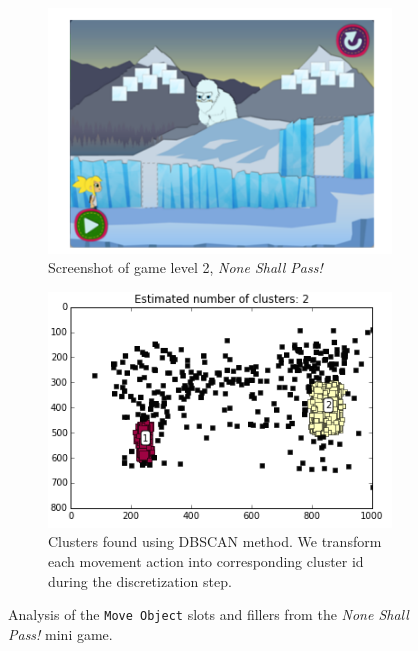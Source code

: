 \documentclass{sigchi}
\begin{document}
	\begin{figure}[ht]
		\centering
		\begin{subfigure}[t]{.5\textwidth}
			\centering
			\includegraphics[width=0.9\columnwidth]{figures/glacier_screenshot.png}
			\caption{Screenshot of game level 2, \textit {None Shall Pass!} \label{fig:screenshot}}
		\end{subfigure}
		\begin{subfigure}[t]{.5\textwidth}
			\centering
			\includegraphics[width=0.9\columnwidth]{figures/glacier_positions.png}
			\caption{Clusters found using DBSCAN method. We transform each movement action into corresponding cluster id during the discretization step. \label{fig:clustering}}
		\end{subfigure}
		\caption{Analysis of the  \texttt{Move Object} slots and fillers from the \textit{None Shall Pass!} mini game.\label{fig:figurecluster}}
	\end{figure}
\end{document}
